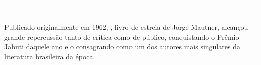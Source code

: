 \hspace*{-2cm}\_\_\_\_\_\_\_\_\_\_\_\_\_\_\_\_\_\_\_\_\_\_\_\_\_\_\_\_\_\_\_\_\_\_\_\_\_\_\_\_\_\_\_\_\_\_\_\_\_\_\_\_\_\_\_\_\_\_\_\_\_\_\_\_\_\_\_\_\_\_\_\_\_\_

\medskip

\noindent{}Publicado originalmente em 1962, {}, livro de estreia de Jorge Mautner, alcançou grande repercussão tanto de crítica como de público, conquistando o Prêmio Jabuti daquele ano e o consagrando como um dos autores mais singulares da literatura brasileira da época.

\hspace{.5cm}

\hspace*{-.4cm}\begin{minipage}[c]{0.90\linewidth}
\small{
{}}
\end{minipage}

\pagebreak
